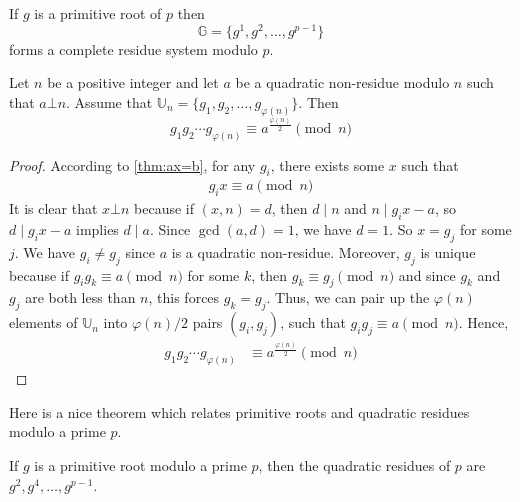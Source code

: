 \documentclass{subfile}
\begin{document}
	\begin{corollary}\label{cor:prres}
		If $g$ is a primitive root of $p$ then
		\[\mathbb G=\{g^1,g^2,\ldots,g^{p-1}\}\]
		forms a complete residue system modulo $p$.
	\end{corollary}

	\begin{theorem}\label{prd}
		Let $n$ be a positive integer and let $a$ be a quadratic non-residue modulo $n$ such that $a\bot n$. Assume that $\mathbb U_n = \{g_1, g_2, \ldots, g_{\varphi(n)}\}$. Then
		\[g_1g_2\cdots g_{\varphi(n)}\equiv a^{\frac{\varphi(n)}{2}}\pmod n\]
	\end{theorem}

	\begin{proof}
		According to \autoref{thm:ax=b}, for any $g_i$, there exists some $x$ such that
			\begin{align}
				g_i x\equiv a\pmod n
			\end{align}
		It is clear that $x \bot n$ because if $(x,n)=d$, then $d\mid n$ and $n\mid g_{i}x-a$, so $d\mid g_ix-a$ implies $d\mid a$. Since $\gcd(a,d)=1$, we have $d=1$. So $x=g_j$ for some $j$. We have $g_i \neq g_j$ since $a$ is a quadratic non-residue. Moreover, $g_j$ is unique because if $g_ig_k \equiv a \pmod n$ for some $k$, then $g_k \equiv g_j \pmod n$ and since $g_k$ and $g_j$ are both less than $n$, this forces $g_k=g_j$. Thus, we can pair up the $\varphi(n)$ elements of $\mathbb{U}_n$ into $\varphi(n)/2$ pairs $(g_i, g_j)$, such that $g_ig_j \equiv a \pmod n$. Hence,
			\begin{align*}
				g_1g_2\cdots g_{\varphi(n)}
					& \equiv a^{\frac{\varphi(n)}{2}}\pmod n
			\end{align*}
	\end{proof}
Here is a nice theorem which relates primitive roots and quadratic residues modulo a prime $p$.
	\begin{theorem}\label{thm:pr+qr}
		If $g$ is a primitive root modulo a prime $p$, then the quadratic residues of $p$ are $g^2,g^4,\ldots,g^{p-1}$.
	\end{theorem}
\end{document}
